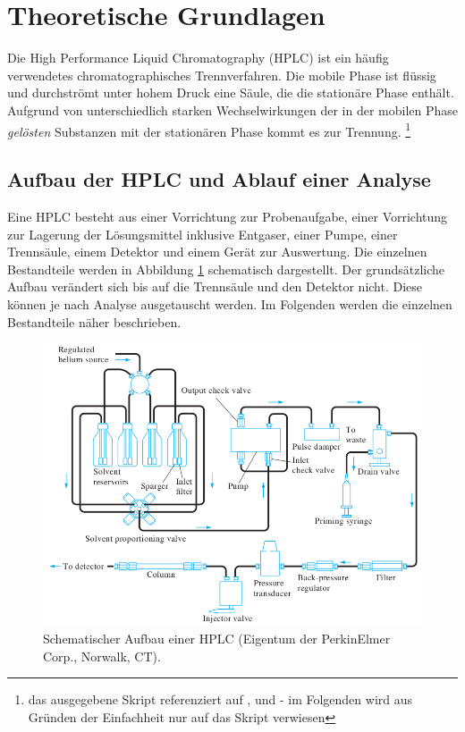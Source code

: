 \section{Theoretische Grundlagen}
  
  Die High Performance Liquid Chromatography (HPLC) ist ein häufig verwendetes chromatographisches Trennverfahren. Die mobile Phase ist flüssig und durchströmt unter hohem Druck eine Säule, die die stationäre Phase enthält. Aufgrund von unterschiedlich starken Wechselwirkungen der in der mobilen Phase \textit{gelösten} Substanzen mit der stationären Phase kommt es zur Trennung. \citep{SkriptHPLC}\footnote{das ausgegebene Skript referenziert auf \citep{QuantitativeAnalyseHarris}, \citep{InstrumentelleAnalytikSkoog} und \citep{ModernLiquidChromatography} - im Folgenden wird aus Gründen der Einfachheit nur auf das Skript verwiesen}
  
  \subsection{Aufbau der HPLC und Ablauf einer Analyse}
    
    Eine HPLC besteht aus einer Vorrichtung zur Probenaufgabe, einer Vorrichtung zur Lagerung der Lösungsmittel inklusive Entgaser, einer Pumpe, einer Trennsäule, einem Detektor und einem Gerät zur Auswertung. Die einzelnen Bestandteile werden in Abbildung \ref{fig:AufbauHPLC} schematisch dargestellt. Der grundsätzliche Aufbau verändert sich bis auf die Trennsäule und den Detektor nicht. Diese können je nach Analyse ausgetauscht werden. Im Folgenden werden die einzelnen Bestandteile näher beschrieben.
    
      \begin{figure}[H]
        \includegraphics[scale=0.3, center]{images/PartsOfHPLC.png} 
        \caption[Schematischer Aufbau einer HPLC (Eigentum der PerkinElmer Corp., Norwalk, CT), Quelle: \citep{InstrumentelleAnalytikSkoog}]{Schematischer Aufbau einer HPLC (Eigentum der PerkinElmer Corp., Norwalk, CT).}
        \label{fig:AufbauHPLC}
      \end{figure}
      
